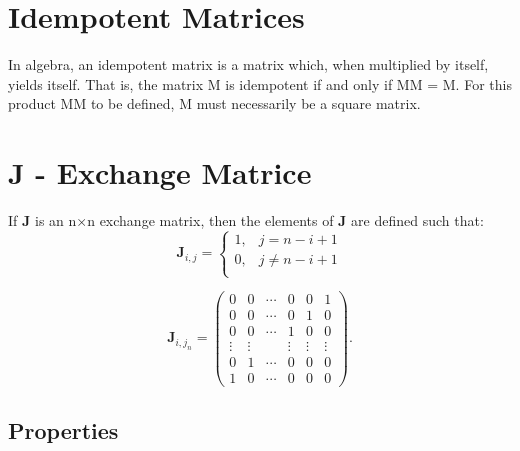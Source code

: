 \section{Idempotent Matrices}
In algebra, an idempotent matrix is a matrix which, when multiplied by itself, yields itself. 
That is, the matrix M is idempotent if and only if MM = M. 
For this product MM to be defined, M must necessarily be a square matrix. 

\section{$\boldsymbol{J}$ - Exchange Matrice}

If $\boldsymbol{J}$ is an n×n exchange matrix, then the elements of $\boldsymbol{J}$ are defined such that:
\[
\boldsymbol{J}_{{i,j}}={\begin{cases}1,&j=n-i+1\\0,&j\neq n-i+1\\\end{cases}}
\]

\[
\boldsymbol{J}_{{i,j}}_{{n}}={\begin{pmatrix}
  0&0&\cdots &0&0&1\\
  0&0&\cdots &0&1&0\\
  0&0&\cdots &1&0&0\\
  \vdots &\vdots &&\vdots &\vdots &\vdots \\
  0&1&\cdots &0&0&0\\
  1&0&\cdots &0&0&0
\end{pmatrix}}.\]

\subsection{Properties}

